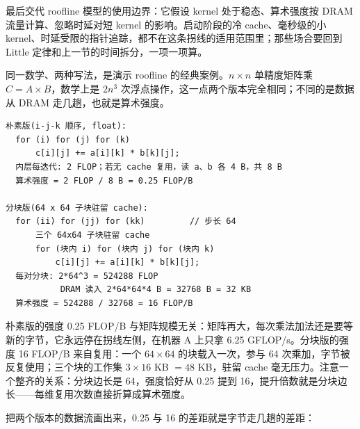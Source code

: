 最后交代 roofline 模型的使用边界：它假设 kernel 处于稳态、算术强度按 DRAM 流量计算、忽略时延对短 kernel 的影响。启动阶段的冷 cache、毫秒级的小 kernel、时延受限的指针追踪，都不在这条拐线的适用范围里；那些场合要回到 Little 定律和上一节的时间拆分，一项一项算。

同一数学、两种写法，是演示 roofline 的经典案例。$n\times n$ 单精度矩阵乘 $C=A\times B$，数学上是 $2n^3$ 次浮点操作，这一点两个版本完全相同；不同的是数据从 DRAM 走几趟，也就是算术强度。

\begin{lstlisting}
朴素版(i-j-k 顺序, float):
  for (i) for (j) for (k)
      c[i][j] += a[i][k] * b[k][j];
  内层每迭代: 2 FLOP；若无 cache 复用，读 a、b 各 4 B，共 8 B
  算术强度 = 2 FLOP / 8 B = 0.25 FLOP/B

分块版(64 x 64 子块驻留 cache):
  for (ii) for (jj) for (kk)         // 步长 64
      三个 64x64 子块驻留 cache
      for (块内 i) for (块内 j) for (块内 k)
          c[i][j] += a[i][k] * b[k][j];
  每对分块: 2*64^3 = 524288 FLOP
           DRAM 读入 2*64*64*4 B = 32768 B = 32 KB
  算术强度 = 524288 / 32768 = 16 FLOP/B
\end{lstlisting}

朴素版的强度 0.25 FLOP/B 与矩阵规模无关：矩阵再大，每次乘法加法还是要等新的字节，它永远停在拐线左侧，在机器 A 上只拿 6.25 GFLOP/s。分块版的强度 16 FLOP/B 来自复用：一个 $64\times64$ 的块载入一次，参与 64 次乘加，字节被反复使用；三个块的工作集 $3\times16$ KB $=48$ KB，驻留 cache 毫无压力。注意一个整齐的关系：分块边长是 64，强度恰好从 0.25 提到 16，提升倍数就是分块边长——每维复用次数直接折算成算术强度。

把两个版本的数据流画出来，0.25 与 16 的差距就是字节走几趟的差距：


